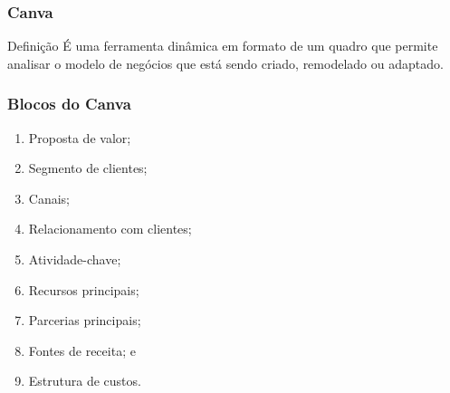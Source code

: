 \documentclass[aspectratio=169]{beamer}
\begin{document}
\begin{frame}
	\frametitle{Canva}

	\begin{block}{Defini\c cão}
		É uma ferramenta dinâmica em formato de um quadro que permite analisar o modelo de negócios que está sendo criado, remodelado ou adaptado.
	\end{block}
\end{frame}

\begin{frame}
	\frametitle{Blocos do Canva}

	\begin{enumerate}
		\item Proposta de valor;
		\item Segmento de clientes;
		\item Canais;
		\item Relacionamento com clientes;
		\item Atividade-chave;
		\item Recursos principais;
		\item Parcerias principais;
		\item Fontes de receita; e
		\item Estrutura de custos.
	\end{enumerate}
\end{frame}
\end{document}
